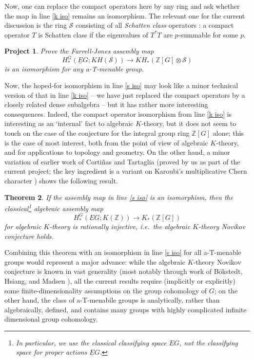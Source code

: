 \documentclass[11pt]{article}
\newcommand{\Z}{\mathbb{Z}}
\theoremstyle{plain}
\newtheorem{theorem}{Theorem}[section]
\newtheorem{project}[theorem]{Project}
\theoremstyle{definition}
\theoremstyle{remark}
\begin{document}
Now, one can replace the compact operators here by any ring and ask whether the map in line \eqref{k iso} remains an isomorphism.  The relevant one for the current discussion is the ring $\mathcal{S}$ consisting of all \emph{Schatten class} operators \cite[Chapter 2]{Simon:2005aa}: a compact operator $T$ is Schatten class if the eigenvalues of $T^*T$ are $p$-summable for some $p$.
 
 \begin{project}
 Prove the Farrell-Jones assembly map
 \begin{equation}\label{s iso}
 H^G_*(\underline{E}G;KH(\mathcal{S})) \to KH_*(\Z[G]\otimes \mathcal{S})
 \end{equation}
 is an isomorphism for any a-T-menable group.
 \end{project}
 
Now, the hoped-for isomorphism in line \eqref{s iso} may look like a minor technical version of that in line \eqref{k iso} -- we have just replaced the compact operators by a closely related dense subalgebra -- but it has rather more interesting consequences.  Indeed, the compact operator isomorphism from line \eqref{k iso} is interesting as an `internal' fact to algebraic $K$-theory, but it does not seem to touch on the case of the conjecture for the integral group ring $\Z[G]$ alone; this is the case of most interest, both from the point of view of algebraic $K$-theory, and for applications to topology and geometry.  On the other hand, a minor variation of earlier work of Corti\~{n}as and Tartaglia \cite{Cortinas:2013ly} (proved by us as part of the current project; the key ingredient is a variant on Karoubi's multiplicative Chern character \cite[Chapter 7]{Karoubi:1987zr}) shows the following result.

\begin{theorem}\label{reg the}
If the assembly map in line \eqref{s iso} is an isomorphism, then the classical\footnote{In particular, we use the classical classifying space $EG$, not the classifying space for proper actions $\underline{E}G$.} algebraic assembly map
$$
H^G_*(EG;K(\mathcal{\Z})) \to K_*(\Z[G])
$$
for algebraic $K$-theory is rationally injective, i.e.\ the \emph{algebraic $K$-theory Novikov conjecture} holds.
\end{theorem}

Combining this theorem with an isomorphism in line \eqref{s iso} for all a-T-menable groups would represent a major advance: while the algebraic $K$-theory Novikov conjecture is known in vast generality (most notably through work of B\"{o}kstedt, Hsiang, and Madsen \cite{Bokstedt:1993il}), all the current results require (implicitly or explicitly) some finite-dimensionality assumptions on the group cohomology of $G$; on the other hand, the class of a-T-menabile groups is analytically, rather than algebraically, defined, and contains many groups with highly complicated infinite dimensional group cohomology. 
\end{document}
